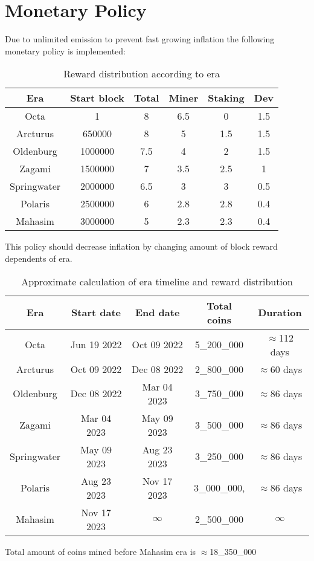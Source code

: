 \section{Monetary Policy}
\label{sec:mp}

Due to unlimited emission to prevent fast growing inflation the following monetary policy is implemented:

\begin{table}[h!]
\centering
\begin{tabular}{||c c c c c c||}
    \hline
        Era & Start block & Total & Miner & Staking & Dev \\ [0.5ex]

        \hline\hline
        Octa & 1 & 8 & 6.5 & 0 & 1.5 \\
        Arcturus & 650000 & 8 & 5 & 1.5 & 1.5 \\
        Oldenburg & 1000000 & 7.5 & 4 & 2 & 1.5 \\
        Zagami & 1500000 & 7 & 3.5 & 2.5 & 1 \\
        Springwater & 2000000 & 6.5 & 3 & 3 & 0.5 \\
        Polaris & 2500000 & 6 & 2.8 & 2.8 & 0.4 \\
        Mahasim & 3000000 & 5 & 2.3 & 2.3 & 0.4 \\ [1ex]
    \hline

\end{tabular}
\caption{Reward distribution according to era}
\label{table:1}
\end{table}

This policy should decrease inflation by changing amount of block reward dependents of era.


\begin{table}[h!]
\centering
\begin{tabular}{||c c c c c||}
    \hline
        Era & Start date & End date & Total coins & Duration \\ [0.5ex]

        \hline\hline
        Octa & Jun 19 2022 & Oct 09 2022 & 5\_200\_000 & $\approx$112 days \\
        Arcturus & Oct 09 2022 & Dec 08 2022 & 2\_800\_000 & $\approx$60 days \\
        Oldenburg & Dec 08 2022 & Mar 04 2023 & 3\_750\_000 & $\approx$86 days \\
        Zagami & Mar 04 2023 & May 09 2023 &  3\_500\_000 & $\approx$86 days \\
        Springwater & May 09 2023 & Aug 23 2023 & 3\_250\_000 & $\approx$86 days \\
        Polaris & Aug 23 2023& Nov 17 2023 & 3\_000\_000, & $\approx$86 days \\
        Mahasim & Nov 17 2023 & $\infty$ & 2\_500\_000 & $\infty$ \\ [1ex]
    \hline

\end{tabular}
\caption{Approximate calculation of era timeline and reward distribution}
\label{table:1}
\end{table}

Total amount of coins mined before Mahasim era is $\approx$18\_350\_000
